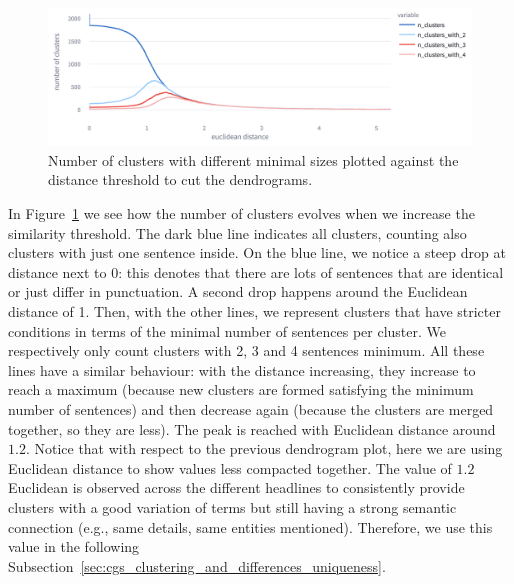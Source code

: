 \begin{figure}[!htbp]
    \centering
    \includegraphics[width=\linewidth]{figures/clusters_count_by_threshold_bigger_2.png}
    \caption{
    Number of clusters with different minimal sizes plotted against the distance threshold to cut the dendrograms.
    }
    \label{fig:clusers_count_by_threshold}
\end{figure}
In Figure~\ref{fig:clusers_count_by_threshold} we see how the number of clusters evolves when we increase the similarity threshold. 
The dark blue line indicates all clusters, counting also clusters with just one sentence inside.
On the blue line, we notice a steep drop at distance next to $0$: this denotes that there are lots of sentences that are identical or just differ in punctuation.
A second drop happens around the Euclidean distance of 1.
Then, with the other lines, we represent clusters that have stricter conditions in terms of the minimal number of sentences per cluster. We respectively only count clusters with 2, 3 and 4 sentences minimum.
All these lines have a similar behaviour: with the distance increasing, they increase to reach a maximum (because new clusters are formed satisfying the minimum number of sentences) and then decrease again (because the clusters are merged together, so they are less). 
The peak is reached with Euclidean distance around $1.2$.
Notice that with respect to the previous dendrogram plot, here we are using Euclidean distance to show values less compacted together.
The value of $1.2$ Euclidean is observed across the different headlines to consistently provide clusters with a good variation of terms but still having a strong semantic connection (e.g., same details, same entities mentioned).
Therefore, we use this value in the following Subsection~\ref{sec:cgs_clustering_and_differences_uniqueness}.

